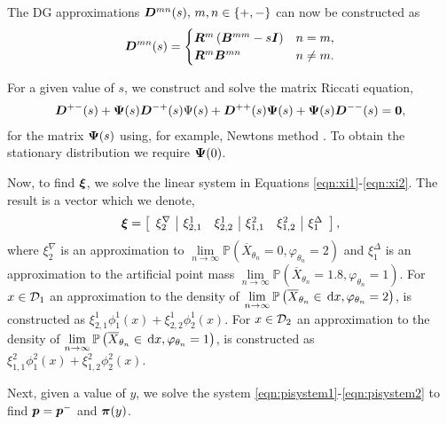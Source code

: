 The DG approximations \(  \boldsymbol D^{m n}(s),\, m,n\in\{+,-\}\) can now be constructed as 
\[  \boldsymbol D^{m n}(s) = \begin{cases}   \boldsymbol R^m\left({  \boldsymbol B}^{mm} - s \boldsymbol I\right) & n=m,
	\\   \boldsymbol R^m {  \boldsymbol B}^{mn} & n \neq m. \end{cases}\]

For a given value of \(s\), we construct and solve the matrix Riccati equation,
\begin{align*}
	\boldsymbol D^{+-}(s)
+ \boldsymbol \Psi(s)   \boldsymbol D^{-+}(s)\Psi(s)
+   \boldsymbol D^{++}(s)\boldsymbol \Psi(s)
+ \boldsymbol \Psi(s)  \boldsymbol D^{--}(s)
= \boldsymbol 0,
\end{align*}
for the matrix \(\boldsymbol \Psi(s)\) using, for example, Newtons method \citep{bot08}. To obtain the stationary distribution we require \(\boldsymbol \Psi(0)\). 

Now, to find \( {\boldsymbol\xi}\), we solve the linear system in Equations \eqref{eqn:xi1}-\eqref{eqn:xi2}. The result is a vector which we denote, 
\[ {\boldsymbol\xi} = \left[\begin{array}{c|cc|cc|c} {\xi}^\nabla_{2} &  {\xi}_{2,1}^1 &  {\xi}_{2,2}^1 &  {\xi}_{1,1}^2 &  {\xi}_{1,2}^2 &  {\xi}_{1}^\Delta \end{array}\right],\]
where \( {\xi}^\nabla_{2}\) is an approximation to \( \lim\limits_{n\to\infty}\mathbb{P}\left(\overline X_{\theta_n} =0, \varphi_{\theta_n} = 2\right)\) and \( {\xi}^\Delta_{1}\) is an approximation to the artificial point mass \( \lim\limits_{n\to\infty}\mathbb{P}\left(\overline X_{\theta_n} =1.8, \varphi_{\theta_n} = 1\right)\). For \(x\in\mathcal{D}_1\) an approximation to the density of \( \lim\limits_{n\to\infty}\mathbb{P}\left(\overline X_{\theta_n} \in \, \mathrm{d} x, \varphi_{\theta_n} = 2\right)\), is constructed as \( {\xi}_{2,1}^1\phi_1^1(x) +  {\xi}_{2,2}^1\phi_2^1(x)\). For \(x\in\mathcal{D}_2\) an approximation to the density of \( \lim\limits_{n\to\infty}\mathbb{P}\left(\overline X_{\theta_n} \in \, \mathrm{d} x, \varphi_{\theta_n} = 1\right)\), is constructed as \( {\xi}_{1,1}^2\phi_1^2(x) +  {\xi}_{1,2}^2\phi_2^2(x).\)

Next, given a value of \(y\), we solve the system \eqref{eqn:pisystem1}-\eqref{eqn:pisystem2} to find \( {\boldsymbol p}= {\boldsymbol p}^-\) and \( {\boldsymbol \pi}(y)\). 

